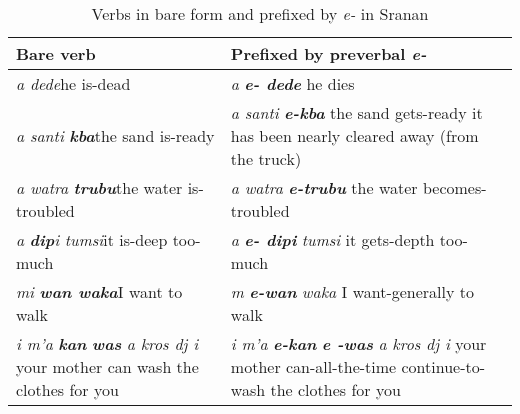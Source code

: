 \begin{table}[t]
  \caption{Verbs in bare form and prefixed by \textit{e-} in Sranan
    \citep[377--378]{Voorhoeve1957}}
  \label{tab:srananverbs}
  \begin{tabularx}{\textwidth}{QQ}
    \lsptoprule

    Bare verb & Prefixed by preverbal \textit{e-}\\
    \midrule \textit{a dede}\newline he is-dead & \textit{a}
    \textbf{\textit{e- dede}}\newline
    he dies \\

    \tablevspace \textit{a santi} \textbf{\textit{kba}}\newline the
    sand is-ready & \textit{a santi} \textbf{\textit{e-kba}}\newline
    the sand gets-ready\newline
    it has been nearly cleared away (from the         truck)\\

    \tablevspace \textit{a watra} \textbf{\textit{trubu}}\newline the
    water is-troubled & \textit{a watra}
    \textbf{\textit{e-trubu}}\newline
    the water becomes-troubled\\

    \tablevspace \textit{a} \textbf{\textit{dip}}\textit{i
      tumsi}\newline it is-deep too-much & \textit{ a}
    \textbf{\textit{e- dipi}} \textit{tumsi}\newline
    it gets-depth too-much\\

    \tablevspace \textit{mi} \textbf{\textit{wan waka}}\newline I want
    to walk & \textit{m} \textbf{\textit{e-wan}} \textit{waka}\newline
    I want-generally to walk\\

    \tablevspace \textit{i m’a} \textbf{\textit{kan}}
    \textbf{\textit{was}} \textit{a kros dj i} \newline your mother
    can wash the clothes for you & \textit{i m’a}
    \textbf{\textit{e-kan}} \textbf{\textit{e -was} }\textit{a kros dj
      i}\newline
    your mother can-all-the-time continue-to-wash the clothes for you\\


\end{tabularx}
\end{table}
